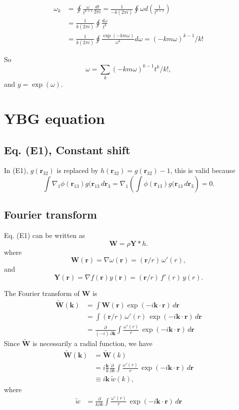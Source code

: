 \documentclass[aip,jcp,reprint,superscriptaddress]{revtex4-1}
\numberwithin{equation}{subsection}
\newcommand{\vct}[1]{\mathbf{#1}}
\providecommand{\vr}{} %
\renewcommand{\vr}{\vct{r}}
\newcommand{\vk}{\vct{k}}
\begin{document}
\begin{align*}
\omega_k
&=
\oint \frac{\omega}{t^{k+1}} \frac{dt}{2\pi i}
=
\frac{1}{-k (2\pi i)} \oint \omega d\left(\frac{1}{t^{k+1}}\right)
\\
&=
\frac{1}{k (2\pi i)} \oint \frac{ d\omega }{t^{k}}
\\
&=
\frac{1}{k (2\pi i)} \oint \frac{ \exp( -k m\omega)  }{\omega^{k}} d\omega
=(-k m \omega)^{k-1} / k!
\end{align*}

So
\[
  \omega = \sum_k (-k m \omega)^{k-1} t^k / k!,
\]
and $y = \exp(\omega)$.




\section{YBG equation}

\subsection{Eq. (E1), Constant shift}

In (E1), $g(\vr_{32})$ is replaced by $h(\vr_{32}) = g(\vr_{32}) - 1$,
this is valid because
\[
 \int \nabla_1 \phi(\vr_{13}) g(\vr_{13} \, d\vr_3
= \nabla_1 \left( \int \phi(\vr_{13}) g(\vr_{13} \, d\vr_3 \right)
= 0.
\]


\subsection{Fourier transform}

Eq. (E1) can be written as
\[
  \vct{W}
=
\rho \vct{Y} * h.
\]
where
\[
  \vct{W}(\vr) = \nabla \omega(\vr) = (\vr/r) \, \omega'(r),
\]
and
\[
  \vct{Y}(\vr) = \nabla f(\vr) y(\vr)
  = (\vr/r) \, f'(r) \, y(r).
\]

The Fourier transform of $\vct W$ is
\begin{align*}
  \tilde{\vct{W}}(\vk)
&=
\int \vct{W}(\vr) \exp(-i\vk\cdot\vr) \, d\vr
\\
&=
\int (\vr/r) \, \omega'(r) \, \exp(-i\vk\cdot\vr) \, d\vr
\\
&=
\frac{\partial}{(-i) \, \partial \vk}
\int \frac{\omega'(r)}{r} \, \exp(-i\vk\cdot\vr) \, d\vr
\end{align*}
%
Since $\tilde{\vct{W}}$ is necessarily a radial function,
we have
\begin{align*}
  \tilde{\vct{W}}(\vk)
&=
  \tilde{\vct{W}}(k)
\\
&=
i \frac{\vk}{k} \frac{\partial}{\partial k}
\int \frac{\omega'(r)}{r} \, \exp(-i\vk\cdot\vr) \, d\vr
\\
&\equiv
i \vk \, \tilde{w}(k),
\end{align*}
where
\begin{align*}
\tilde{w}
&=
\frac{\partial}{k\partial k}
\int \frac{\omega'(r)}{r} \, \exp(-i\vk\cdot\vr) \, d\vr
\end{align*}
\end{document}
